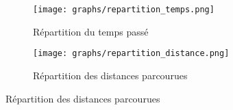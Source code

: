 \documentclass[a4paper,french,11pt]{report}
\begin{document}
\begin{figure}[!ht]
\begin{subfigure}{.49\linewidth}

\centering

\texttt{[image: graphs/repartition\_temps.png]}
\caption*{Répartition du temps passé}

\end{subfigure}\hfill
\begin{subfigure}{.49\linewidth}

\centering

\texttt{[image: graphs/repartition\_distance.png]}
\caption*{Répartition des distances parcourues}

\end{subfigure}

\end{figure}


%
%
%
%
%
%
%

\end{document}
